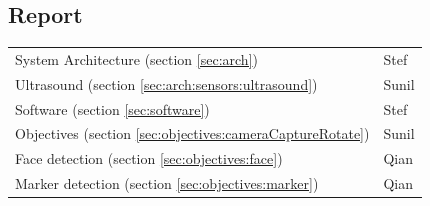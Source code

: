 \documentclass[11pt, a4paper, onecolumn, oneside, parskip=half]{scrartcl}
\begin{document}
\subsection{Report}
\begin{tabular}{ll}
System Architecture (section \ref{sec:arch}) & Stef \\
Ultrasound (section \ref{sec:arch:sensors:ultrasound}) & Sunil \\
Software (section \ref{sec:software}) & Stef \\
Objectives (section \ref{sec:objectives:cameraCaptureRotate}) & Sunil \\
Face detection (section \ref{sec:objectives:face}) & Qian \\
Marker detection (section \ref{sec:objectives:marker}) & Qian \\
\end{tabular}

\newpage
\end{document}
